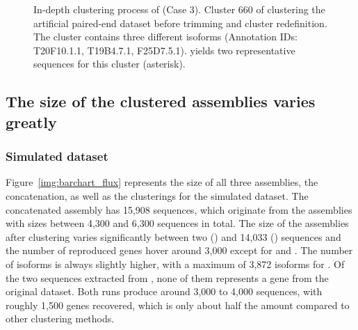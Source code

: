 \documentclass[12pt,a4paper,english]{article}
\begin{document}
		\begin{figure}[H]
			\centering
			\def\svgwidth{0.7\textwidth}
			
			\caption[In-depth clustering process of \karma (Case 3).]{In-depth clustering process of \karma (Case 3). Cluster 660 of clustering the artificial paired-end dataset before trimming and cluster redefinition. The cluster contains three different isoforms (Annotation IDs: T20F10.1.1, T19B4.7.1, F25D7.5.1). \mcl yields two representative sequences for this cluster (asterisk).}
			\label{img:cluster660}
		\end{figure}

	\newpage
	\subsection{The size of the clustered assemblies varies greatly}

	\subsubsection*{Simulated \celegans dataset}
	    Figure~\ref{img:barchart_flux} represents the size of all three assemblies, the concatenation, as well as the clusterings for the simulated \celegans dataset.
		The concatenated assembly has 15,908 sequences, which originate from the assemblies with sizes between 4,300 and 6,300 sequences in total.
		The size of the assemblies after clustering varies significantly between two (\grouper) and 14,033 (\mclust) sequences and the number of reproduced genes hover around 3,000 except for \karma and \grouper. The number of isoforms is always slightly higher, with a maximum of 3,872 isoforms for \mclust.
		Of the two sequences extracted from \grouper, none of them represents a gene from the original dataset.
		Both \karma runs produce around 3,000 to 4,000 sequences, with roughly 1,500 genes recovered, which is only about half the amount compared to other clustering methods.
	
\end{document}
